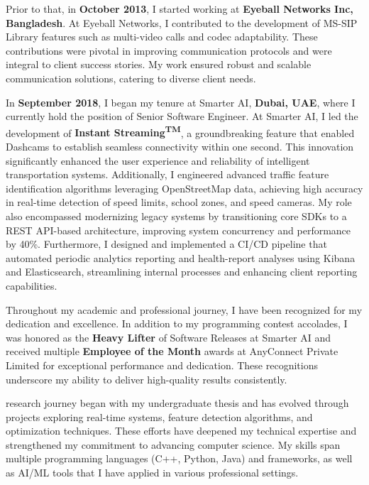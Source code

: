 \documentclass[11pt]{article}
\begin{document}
Prior to that, in \textbf{October 2013}, I started working at \textbf{Eyeball Networks Inc, Bangladesh}. At
Eyeball Networks, I contributed to the development of MS-SIP Library features such as multi-video calls and
codec adaptability. These contributions were pivotal in improving communication protocols and were integral
to client success stories. My work ensured robust and scalable communication solutions, catering to diverse
client needs.

In \textbf{September 2018}, I began my tenure at Smarter AI, \textbf{Dubai, UAE}, where I currently hold the position
of Senior Software Engineer. At Smarter AI, I led the development of \textbf{Instant Streaming\textsuperscript{TM}},
a groundbreaking feature that enabled Dashcams to establish seamless connectivity within one second. This
innovation significantly enhanced the user experience and reliability of intelligent transportation systems.
Additionally, I engineered advanced traffic feature identification algorithms leveraging OpenStreetMap data,
achieving high accuracy in real-time detection of speed limits, school zones, and speed cameras. My role also
encompassed modernizing legacy systems by transitioning core SDKs to a REST API-based architecture,
improving system concurrency and performance by 40\%. Furthermore, I designed and implemented a CI/CD pipeline
that automated periodic analytics reporting and health-report analyses using Kibana and Elasticsearch,
streamlining internal processes and enhancing client reporting capabilities.

Throughout my academic and professional journey, I have been recognized for my dedication and excellence.
In addition to my programming contest accolades, I was honored as the \textbf{Heavy Lifter} of Software Releases at
Smarter AI and received multiple \textbf{Employee of the Month} awards at AnyConnect Private Limited for exceptional
performance and dedication. These recognitions underscore my ability to deliver high-quality results consistently.

\ifshowsections{}\fi
\firstparagraphMy research journey began with my undergraduate thesis and has evolved through projects exploring real-time
systems, feature detection algorithms, and optimization techniques. These efforts have deepened my technical
expertise and strengthened my commitment to advancing computer science. My skills span multiple programming
languages (C++, Python, Java) and frameworks, as well as AI/ML tools that I have applied in various professional
settings.
\end{document}
